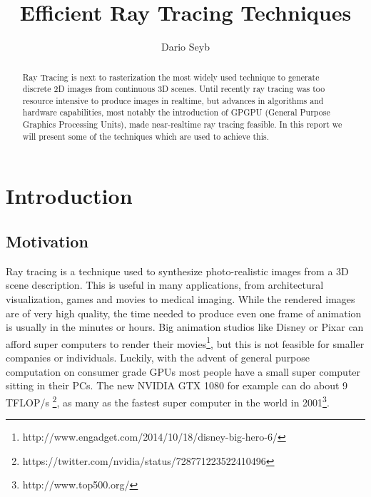\documentclass{ACGSeminar}
\begin{document}
\title{Efficient Ray Tracing Techniques}

\author{Dario Seyb}

\maketitle


\begin{abstract}
Ray Tracing is next to rasterization the most widely used technique to generate discrete 2D images from continuous 3D scenes. Until recently ray tracing was too resource intensive to produce images in realtime, but advances in algorithms and hardware capabilities, most notably the introduction of GPGPU (General Purpose Graphics Processing Units), made near-realtime ray tracing feasible. In this report we will present some of the techniques which are used to achieve this.
\end{abstract}

\tableofcontents


\section{Introduction} \label{introduction}
\subsection{Motivation}
Ray tracing is a technique used to synthesize photo-realistic images from a 3D scene description. This is useful in many applications, from architectural visualization, games and movies to medical imaging. While the rendered images are of very high quality, the time needed to produce even one frame of animation is usually in the minutes or hours. Big animation studios like Disney or Pixar can afford super computers to render their movies\footnote{http://www.engadget.com/2014/10/18/disney-big-hero-6/}, but this is not feasible for smaller companies or individuals. Luckily, with the advent of general purpose computation on consumer grade GPUs most people have a small super computer sitting in their PCs. The new NVIDIA GTX 1080 for example can do about 9 TFLOP/s \footnote{https://twitter.com/nvidia/status/728771223522410496}, as many as the fastest super computer in the world in 2001\footnote{http://www.top500.org/}.
\end{document}
